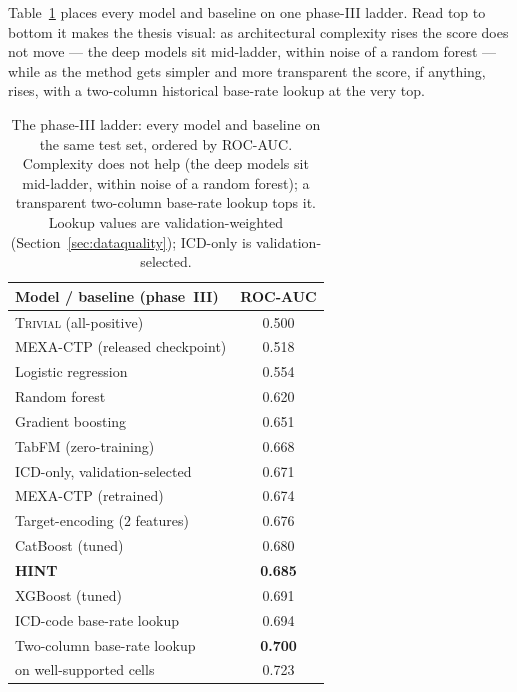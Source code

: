 \documentclass[a4paper,fleqn]{cas-sc}
\begin{document}
Table~\ref{tab:ladder} places every model and baseline on one phase-III ladder. Read top to
bottom it makes the thesis visual: as architectural complexity rises the score does not move ---
the deep models sit mid-ladder, within noise of a random forest --- while as the method gets
simpler and more transparent the score, if anything, rises, with a two-column historical
base-rate lookup at the very top.
\begin{table}[t]
\centering\small
\caption{The phase-III ladder: every model and baseline on the same test set, ordered by
ROC-AUC. Complexity does not help (the deep models sit mid-ladder, within noise of a random
forest); a transparent two-column base-rate lookup tops it. Lookup values are validation-weighted
(Section~\ref{sec:dataquality}); ICD-only is validation-selected.}
\label{tab:ladder}
\begin{tabular}{lc}
\toprule
Model / baseline (phase~III) & ROC-AUC \\
\midrule
\textsc{Trivial} (all-positive) & 0.500 \\
MEXA-CTP (released checkpoint) & 0.518 \\
Logistic regression & 0.554 \\
Random forest & 0.620 \\
Gradient boosting & 0.651 \\
TabFM (zero-training) & 0.668 \\
ICD-only, validation-selected & 0.671 \\
MEXA-CTP (retrained) & 0.674 \\
Target-encoding ($2$ features) & 0.676 \\
CatBoost (tuned) & 0.680 \\
\textbf{HINT} & \textbf{0.685} \\
XGBoost (tuned) & 0.691 \\
ICD-code base-rate lookup & 0.694 \\
Two-column base-rate lookup & \textbf{0.700} \\
\quad on well-supported cells & 0.723 \\
\bottomrule
\end{tabular}
\end{table}
\end{document}
